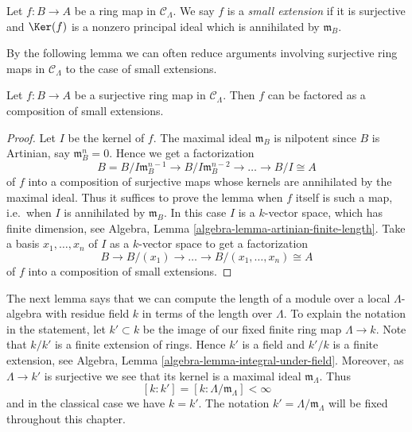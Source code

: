 \begin{definition}
\label{definition-small-extension}
Let $f: B \to A$ be a ring map in $\mathcal{C}_\Lambda$.  We say $f$
is a {\it small extension} if it is surjective and $\Ker(f)$ is a nonzero
principal ideal which is annihilated by $\mathfrak{m}_B$.
\end{definition}

\noindent
By the following lemma we can often reduce arguments involving surjective ring
maps in $\mathcal{C}_\Lambda$ to the case of small extensions.

\begin{lemma}
\label{lemma-factor-small-extension}
Let $f: B \to A$ be a surjective ring map in $\mathcal{C}_\Lambda$.
Then $f$ can be factored as a composition of small extensions.
\end{lemma}

\begin{proof}
Let $I$ be the kernel of $f$.  The maximal ideal $\mathfrak{m}_B$ is
nilpotent since $B$ is Artinian, say $\mathfrak{m}_B^n = 0$. Hence we get a
factorization
$$
B = B/I\mathfrak{m}_B^{n-1} \to B/I\mathfrak{m}_B^{n-2} \to
\ldots \to B/I \cong A
$$
of $f$ into a composition of surjective maps whose kernels are annihilated by
the maximal ideal.  Thus it suffices to prove the lemma when $f$ itself is such
a map, i.e.\ when $I$ is annihilated by $\mathfrak{m}_B$. In this case
$I$ is a $k$-vector space, which has finite dimension, see
Algebra, Lemma \ref{algebra-lemma-artinian-finite-length}.
Take a basis $x_1, \ldots, x_n$ of $I$ as a $k$-vector space to get a
factorization
$$
B \to B/(x_1) \to \ldots \to  B/(x_1, \ldots, x_n) \cong  A
$$
of $f$ into a composition of small extensions.
\end{proof}

\noindent
The next lemma says that we can compute the length of a module over a local
$\Lambda$-algebra with residue field $k$ in terms of the length over
$\Lambda$. To explain the notation in the statement, let $k' \subset k$
be the image of our fixed finite ring map $\Lambda \to k$. Note
that $k/k'$ is a finite extension of rings. Hence $k'$ is a field
and $k'/k$ is a finite extension, see
Algebra, Lemma \ref{algebra-lemma-integral-under-field}.
Moreover, as $\Lambda \to k'$ is surjective we see that its kernel
is a maximal ideal $\mathfrak m_\Lambda$. Thus
\begin{equation}
\label{equation-k-prime}
[k : k'] = [k : \Lambda/\mathfrak m_\Lambda] < \infty
\end{equation}
and in the classical case we have $k = k'$. The notation
$k' = \Lambda/\mathfrak m_\Lambda$ will be fixed throughout this chapter.

